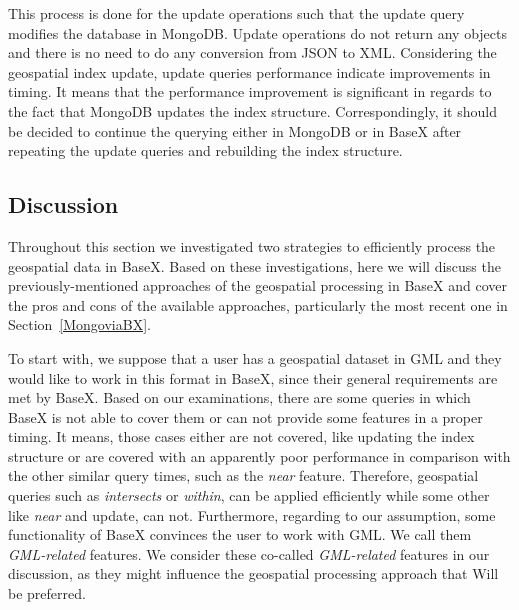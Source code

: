 \documentclass[a4paper,12pt]{article}
\begin{document}


This process is done for the update operations such that the update query modifies the database in MongoDB. Update operations do not return any objects and there is no need to do any conversion from JSON to XML. Considering the geospatial index update, update queries performance indicate improvements in timing. It means that the performance improvement is significant in regards to the fact that MongoDB updates the index structure. Correspondingly, it should be decided to continue the querying either in MongoDB or in BaseX after repeating the update queries and rebuilding the index structure. 



\subsection{Discussion}
\label{s.disc}
Throughout this section we investigated two strategies to efficiently process the geospatial data in BaseX. Based on these investigations, here we will discuss the  previously-mentioned approaches of the geospatial processing in BaseX and cover the pros and cons of the available approaches, particularly the most recent one in Section~\ref{MongoviaBX}. 

To start with, we suppose that a user has a geospatial dataset in GML and they would like to work in this format in BaseX, since their general requirements are met by BaseX. Based on our examinations, there are some queries in which BaseX is not able to cover them or can not provide some features in a proper timing. It means, those cases either are not covered, like updating the index structure or are covered with an apparently poor performance in comparison with the other similar query times, such as the \textit{near} feature. Therefore, geospatial queries such as \textit{intersects} or \textit{within}, can be applied efficiently while some other like \textit{near} and update, can not. Furthermore, regarding to our assumption, some functionality of BaseX convinces the user to work with GML. We call them \textit{GML-related} features. We consider these co-called \textit{GML-related} features in our discussion, as they might influence the geospatial processing approach that Will be preferred.
\end{document}
